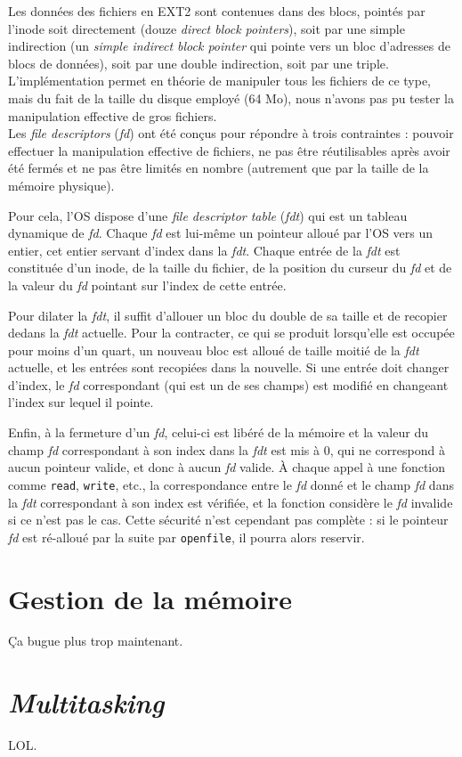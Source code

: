 \documentclass[a4paper, 10pt, french]{article}
\newcommand{\foreign}[1]{\emph{#1}}
\begin{document}
		Les données des fichiers en EXT2 sont contenues dans des blocs, pointés par l'inode soit directement (douze \foreign{direct block pointers}), soit par une simple indirection (un \foreign{simple indirect block pointer} qui pointe vers un bloc d'adresses de blocs de données), soit par une double indirection, soit par une triple. L'implémentation permet en théorie de manipuler tous les fichiers de ce type, mais du fait de la taille du disque employé (64 Mo), nous n'avons pas pu tester la manipulation effective de gros fichiers.\\
		
		Les \foreign{file descriptors} (\foreign{fd}) ont été conçus pour répondre à trois contraintes : pouvoir effectuer la manipulation effective de fichiers, ne pas être réutilisables après avoir été fermés et ne pas être limités en nombre (autrement que par la taille de la mémoire physique). 
		
		Pour cela, l'OS dispose d'une \foreign{file descriptor table} (\foreign{fdt}) qui est un tableau dynamique de \foreign{fd}. Chaque \foreign{fd} est lui-même un pointeur alloué par l'OS vers un entier, cet entier servant d'index dans la \foreign{fdt}. Chaque entrée de la \foreign{fdt} est constituée d'un inode, de la taille du fichier, de la position du curseur du \foreign{fd} et de la valeur du \foreign{fd} pointant sur l'index de cette entrée.
		
		Pour dilater la \foreign{fdt}, il suffit d'allouer un bloc du double de sa taille et de recopier dedans la \foreign{fdt} actuelle. Pour la contracter, ce qui se produit lorsqu'elle est occupée pour moins d'un quart, un nouveau bloc est alloué de taille moitié de la \foreign{fdt} actuelle, et les entrées sont recopiées dans la nouvelle. Si une entrée doit changer d'index, le \foreign{fd} correspondant (qui est un de ses champs) est modifié en changeant l'index sur lequel il pointe.
		
		Enfin, à la fermeture d'un \foreign{fd}, celui-ci est libéré de la mémoire et la valeur du champ \foreign{fd} correspondant à son index dans la \foreign{fdt} est mis à 0, qui ne correspond à aucun pointeur valide, et donc à aucun \foreign{fd} valide. À chaque appel à une fonction comme \verb|read|, \verb|write|, etc., la correspondance entre le \foreign{fd} donné et le champ \foreign{fd} dans la \foreign{fdt} correspondant à son index est vérifiée, et la fonction considère le \foreign{fd} invalide si ce n'est pas le cas. Cette sécurité n'est cependant pas complète : si le pointeur \foreign{fd} est ré-alloué par la suite par \verb|openfile|, il pourra alors reservir.
	
\section{Gestion de la mémoire}

Ça bugue plus trop maintenant.

\section{\foreign{Multitasking}}

LOL.
\end{document}
